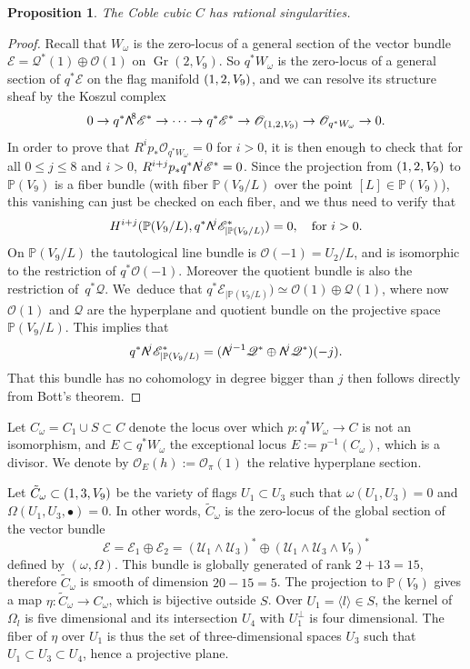 \documentclass[11pt]{article}
\newcommand{\NoChangel}[1]{%
\expandafter\let\csname old\string#1\endcsname=#1
\let#1=\relax
\newcommand{#1}{\mathcode`l="716C\csname old\string#1\endcsname\mathcode`l="7160 }%
}
\newcommand{\sbullet}{{\scriptstyle\bullet}}
\newcommand\bw[1]{{\hbox{\large$\mathsf{\Lambda}$}^{\!#1}}}
\let\mathcal\mathscr
\theoremstyle{plain}
\newtheorem{prop}[theorem]{Proposition}
\theoremstyle{definition}
\DeclareMathOperator{\Gr}{Gr}
\DeclareMathOperator{\Fl}{Fl}\NoChangel{\Fl}
\newcommand{\PP}{\mathbb{P}}
\newcommand{\sheaf}[1]{\mathcal{#1}}
\newcommand{\ke}{\sheaf{E}}
\newcommand{\ko}{\sheaf{O}}\let\OO\ko\let\cO\ko
\newcommand{\kq}{\sheaf{Q}}
\newcommand{\ku}{\sheaf{U}}
\begin{document}
\begin{prop}\label{coblerat}
The Coble cubic $C$ has rational singularities.
\end{prop}

\begin{proof}
Recall that $W_\omega$ is the zero-locus of a general section of the vector bundle $\ke=\kq^*(1)\oplus \ko(1)$ on $\Gr(2,V_9)$. So $q^*W_\omega$ is the zero-locus of a general
section of $q^*\ke$ on the flag manifold $\Fl(1,2,V_9)$, and we can resolve its structure
sheaf by the Koszul complex\enlargethispage{-1.5\baselineskip}%
\[
0\to q^*\bw8\ke^*\to\cdots\to q^*\ke^*\to \ko_{\Fl(1,2,V_9)}\to\ko_{q^*W_\omega}\to 0.
\]
In order to prove that $R^ip_{*}\ko_{q^*W_\omega}=0$ for $i>0$, it is then enough to check
that for all $0\le j\le 8$ and $i>0$, $R^{i+j}p_{*}q^*\bw{j}\ke^*=0$. Since the
projection from $\Fl(1,2,V_9)$ to $\PP(V_9)$ is a fiber bundle (with fiber $\PP(V_9/L)$ over the
point $[L]\in \PP(V_9)$), this vanishing can just be checked on each fiber, and we thus
need to verify that
\[
H^{i+j}(\PP(V_9/L), q^*\bw{j}\ke^*_{|\PP(V_9/L)})=0, \quad\text{for } i>0.
\]
On $\PP(V_9/L)$ the tautological line bundle is $\ko(-1)=U_2/L$, and is isomorphic to the restriction of $q^*\ko(-1)$. Moreover the quotient bundle is also the restriction of~$q^*\kq$.
We~deduce that $q^*\ke_{|\PP(V_9/L)})\simeq \ko(1)\oplus \kq(1)$, where now $\ko(1)$ and $\kq$
are the hyperplane and quotient bundle on the projective space $\PP(V_9/L)$. This implies that
\[
q^*\bw{j}\ke^*_{|\PP(V_9/L)}=(\bw{j-1}\kq^*\oplus \bw{j}\kq^*)(-j).
\]
That this bundle has no cohomology in degree bigger than $j$ then follows directly from
Bott's theorem.
\end{proof}

Let $C_\omega=C_1\cup S\subset C$ denote the locus over which $p: q^* W_{\omega} \to C$ is not an
isomorphism, and $E \subset q^* W_\omega$ the exceptional locus $E:=p^{-1}(C_\omega)$, which is
a divisor. We denote by $\ko_E(h):=\ko_\pi(1)$ the relative hyperplane section.

Let $\tilde C_\omega\subset
\Fl(1,3,V_9)$ be the variety of flags $U_1\subset U_3$ such that $\omega(U_1,U_3)=0$ and
$\Omega(U_1,U_3,\sbullet)=0$. In other words, $\tilde C_\omega$ is the zero-locus of the
global section of the vector bundle \[
\ke=\ke_1\oplus\ke_2=(\ku_1\wedge \ku_3)^*\oplus (\ku_1\wedge \ku_3\wedge V_9)^*
\]
defined by $(\omega, \Omega)$.
This bundle is globally generated of rank $2+13=15$, therefore $\tilde C_\omega$ is smooth
of dimension $20-15=5$. The projection to $\PP (V_9)$ gives a map $\eta : \tilde C_\omega\to C_\omega$,
which is bijective outside $S$.
Over $U_1=\langle l\rangle\in S$, the kernel of $\Omega_l$ is five
dimensional and its intersection $U_4$ with $U_1^\perp$ is four dimensional.
The fiber of $\eta$ over $U_1$ is thus the set of three-dimensional spaces $U_3$
such that $U_1\subset U_3\subset U_4$,
hence a projective plane.
\end{document}
